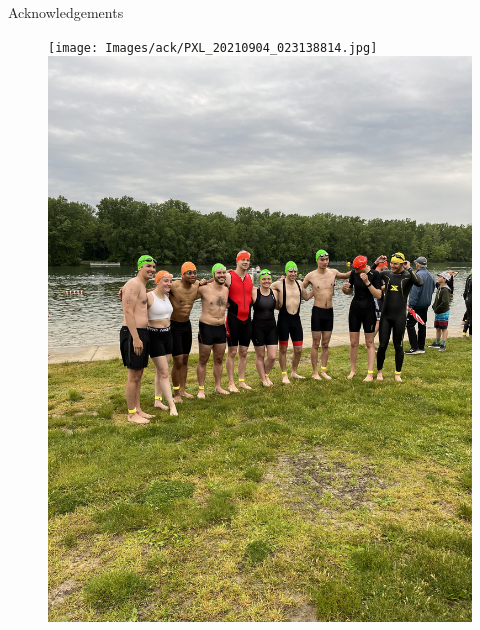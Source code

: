 \documentclass[]{beamer}
\begin{document}
\begin{frame}[noframenumbering]{Acknowledgements}
	\begin{figure}
		\begin{minipage}{0.49\linewidth}
			\centering
			\texttt{[image: Images/ack/PXL\_20210904\_023138814.jpg]}
			\vspace{-1em}
			\includegraphics[angle=270,width=0.85\linewidth,trim={100em 0em 100em 0em},clip]{Images/ack/IMG_3559.jpg}
			

\end{minipage}
\end{figure}
\end{frame}
\end{document}
